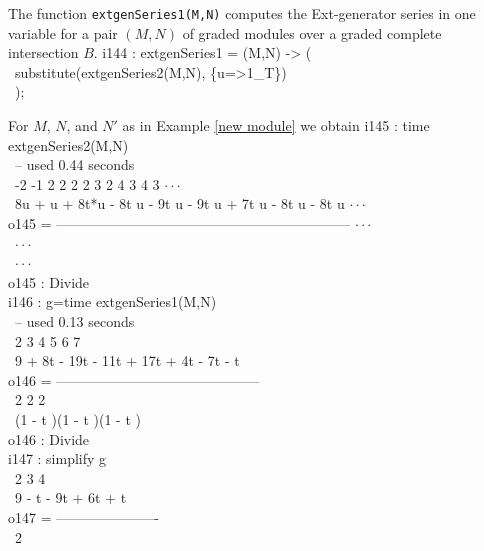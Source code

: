 \begin{sCode}
The function {\tt extgenSeries1(M,N)} computes the Ext-genera\-tor series in
one variable for a pair $(M,N)$ of graded modules over a graded complete
intersection $B$.
\beginOutput
i144 : extgenSeries1 = (M,N) -> (\\
\          substitute(extgenSeries2(M,N), \{u=>1_T\})\\
\          );\\
\endOutput
\end{sCode}

\begin{sExample}
For $M$, $N$, and $N'$ as in Example \ref{new module} we obtain
\beginOutput
i145 : time extgenSeries2(M,N)\\
\     -- used 0.44 seconds\\
\emptyLine
\         -2    -1            2      2 2     2 3     2 4     3 4     3  $\cdot\cdot\cdot$\\
\       8u   + u   + 8t*u - 8t u - 9t u  - 9t u  + 7t u  - 8t u  - 8t u $\cdot\cdot\cdot$\\
o145 = --------------------------------------------------------------- $\cdot\cdot\cdot$\\
\                                                                       $\cdot\cdot\cdot$\\
\                                                                       $\cdot\cdot\cdot$\\
\emptyLine
o145 : Divide\\
\endOutput
\beginOutput
i146 : g=time extgenSeries1(M,N)\\
\     -- used 0.13 seconds\\
\emptyLine
\                   2      3      4     5     6    7\\
\       9 + 8t - 19t  - 11t  + 17t  + 4t  - 7t  - t\\
o146 = --------------------------------------------\\
\                       2       2       2\\
\                 (1 - t )(1 - t )(1 - t )\\
\emptyLine
o146 : Divide\\
\endOutput
\beginOutput
i147 : simplify g\\
\emptyLine
\                 2     3    4\\
\       9 - t - 9t  + 6t  + t\\
o147 = ----------------------\\
\                         2\\

\end{sExample}
